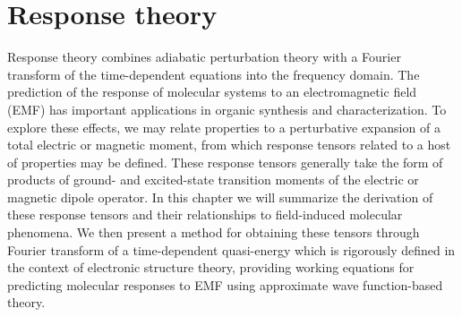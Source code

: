 \section{Response theory} \label{se:res}
Response theory combines adiabatic perturbation theory with a Fourier transform of the 
time-dependent equations into the frequency domain\cite{Barron2004,Pedersen2021}. 
The prediction of the response of molecular systems to an electromagnetic field (EMF) has 
important applications in organic synthesis and characterization. To explore these 
effects, we may relate properties to a perturbative expansion of a total electric or 
magnetic moment, from which response tensors related to a host of properties may be defined. 
These response tensors generally take the form of products of ground- and excited-state 
transition moments of the electric or magnetic dipole operator. In this chapter we will 
summarize the derivation of these response tensors and their relationships to field-induced 
molecular phenomena. We then present a method for obtaining these tensors through Fourier 
transform of a time-dependent quasi-energy
\cite{Christiansen1998,Norman2011,Helgaker2012}
which is rigorously defined in the context of 
electronic structure theory, providing working equations for predicting molecular responses 
to EMF using approximate wave function-based theory.

